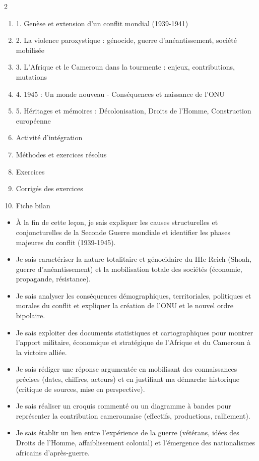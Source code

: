 \documentclass[11pt]{article}
\begin{document}
\begin{sommaire}
\begin{multicols}{2}
\begin{enumerate}
\item 1. Genèse et extension d'un conflit mondial (1939-1941)
\item 2. La violence paroxystique : génocide, guerre d'anéantissement, société mobilisée
\item 3. L'Afrique et le Cameroun dans la tourmente : enjeux, contributions, mutations
\item 4. 1945 : Un monde nouveau - Conséquences et naissance de l'ONU
\item 5. Héritages et mémoires : Décolonisation, Droits de l'Homme, Construction européenne
\item Activité d'intégration
\item Méthodes et exercices résolus
\item Exercices
\item Corrigés des exercices
\item Fiche bilan
\end{enumerate}
\end{multicols}
\end{sommaire}

\begin{objectifs}
\begin{itemize}
\item À la fin de cette leçon, je sais expliquer les causes structurelles et conjoncturelles de la Seconde Guerre mondiale et identifier les phases majeures du conflit (1939-1945).
\item Je sais caractériser la nature totalitaire et génocidaire du IIIe Reich (Shoah, guerre d'anéantissement) et la mobilisation totale des sociétés (économie, propagande, résistance).
\item Je sais analyser les conséquences démographiques, territoriales, politiques et morales du conflit et expliquer la création de l'ONU et le nouvel ordre bipolaire.
\item Je sais exploiter des documents statistiques et cartographiques pour montrer l'apport militaire, économique et stratégique de l'Afrique et du Cameroun à la victoire alliée.
\item Je sais rédiger une réponse argumentée en mobilisant des connaissances précises (dates, chiffres, acteurs) et en justifiant ma démarche historique (critique de sources, mise en perspective).
\item Je sais réaliser un croquis commenté ou un diagramme à bandes pour représenter la contribution camerounaise (effectifs, productions, ralliement).
\item Je sais établir un lien entre l'expérience de la guerre (vétérans, idées des Droits de l'Homme, affaiblissement colonial) et l'émergence des nationalismes africains d'après-guerre.
\end{itemize}
\end{objectifs}
\end{document}
